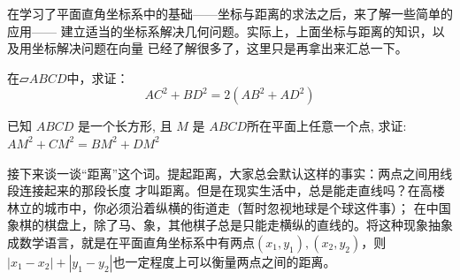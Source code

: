 在学习了平面直角坐标系中的基础——坐标与距离的求法之后，来了解一些简单的应用——
建立适当的坐标系解决几何问题。实际上，上面坐标与距离的知识，以及用坐标解决问题在向量
已经了解很多了，这里只是再拿出来汇总一下。
\begin{example}
在$ \parallelogram A B C D $中，求证： 
\begin{equation}
    A C^{2}+B D^{2}=2\left(A B^{2}+A D^{2}\right)
\end{equation}
\end{example}
\begin{exercise}
    已知  $A B C D $ 是一个长方形, 且 $ M $ 是 $ A B C D  $所在平面上任意一个点, 求证: $ A M^{2}+C M^{2}=B M^{2}+D M^{2} $
\end{exercise}


接下来谈一谈“距离”这个词。提起距离，大家总会默认这样的事实：两点之间用线段连接起来的那段长度
才叫距离。但是在现实生活中，总是能走直线吗？在高楼林立的城市中，你必须沿着纵横的街道走（暂时忽视地球是个球这件事）；
在中国象棋的棋盘上，除了马、象，其他棋子总是只能走横纵的直线的。将这种现象抽象成数学语言，就是在平面直角坐标系中有两点\((x_1,y_1),(x_2,y_2)\)，则
\(|x_1-x_2|+|y_1-y_2|\)也一定程度上可以衡量两点之间的距离。

